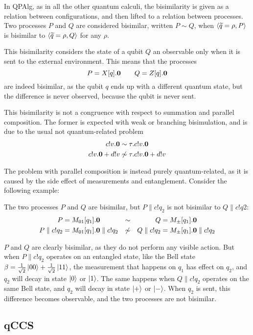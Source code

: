 In QPAlg, as in all the other quantum calculi, the bisimilarity is given as a relation between configurations, and then lifted to a relation between processes. Two processes $P$ and $Q$ are considered bisimilar, written $P \sim Q$, when $\langle\widetilde{q} = \rho, P\rangle$ is bisimilar to $\langle\widetilde{q} = \rho, Q\rangle$ for any $\rho$.

This bisimilarity considers the state of a qubit $Q$ an observable only when it is sent to the external environment. This means that the processes 
\[ P = X[q].\mathbf{0} \qquad Q = Z[q].\mathbf{0}\]
are indeed bisimilar, as the qubit $q$ ends up with a different quantum state, but the difference is never observed, because the qubit is never sent.

This bisimilarity is not a congruence with respect to summation and parallel composition. The former is expected with weak or branching bisimulation, and is due to the usual not quantum-related problem 
\begin{align*}
c!v.\mathbf{0} &\sim \tau.c!v.\mathbf{0} \\
c!v.\mathbf{0} + d!v &\not\sim \tau.c!v.\mathbf{0} + d!v
\end{align*}

The problem with parallel composition is instead purely quantum-related, as it is caused by the side effect of measurements and entanglement. Consider the following example:

\begin{example}
The two processes $P$ and $Q$ are bisimilar, but $P\parallel c!q_2$ is not bisimilar to $Q \parallel c!q2$:
\begin{align*}
 P &= M_{01}[q_1].\mathbf{0} &\sim & & Q &= M_\pm[q_1].\mathbf{0} \\ 
 P \parallel c!q_2 &=  M_{01}[q_1].\mathbf{0} \parallel c!q_2 &\not\sim & & Q \parallel c!q_2 &=  M_\pm[q_1].\mathbf{0} \parallel c!q_2 
\end{align*} 

$P$ and $Q$ are clearly bisimilar, as they do not perform any visible action. But when $P\parallel c!q_2$ operates on an entangled state, like the Bell state $\beta = \frac{1}{\sqrt{2}}\ket{00} + \frac{1}{\sqrt{2}}\ket{11}$, the measurement that happens on $q_1$ has effect on $q_2$, and $q_2$ will decay in state $\ket{0}$ or $\ket{1}$. The same happens when $Q\parallel c!q_2$ operates on the same Bell state, and $q_2$ will decay in state $\ket{+}$ or $\ket{-}$. When $q_2$ is sent, this difference becomes observable, and the two processes are not bisimilar.
\end{example}
\subsection{qCCS}

